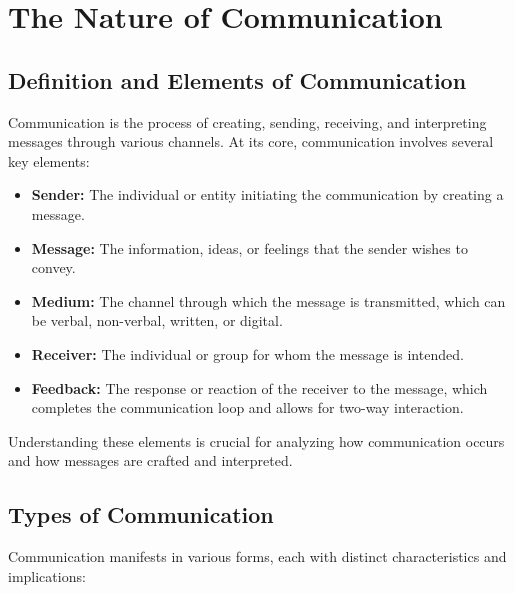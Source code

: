 \documentclass[
]{book}
\providecommand{\tightlist}{%
  \setlength{\itemsep}{0pt}\setlength{\parskip}{0pt}}
\begin{document}
\hypertarget{the-nature-of-communication}{%
\section{The Nature of Communication}\label{the-nature-of-communication}}

\hypertarget{definition-and-elements-of-communication}{%
\subsection*{Definition and Elements of Communication}\label{definition-and-elements-of-communication}}

Communication is the process of creating, sending, receiving, and interpreting messages through various channels. At its core, communication involves several key elements:

\begin{itemize}
\tightlist
\item
  \textbf{Sender:} The individual or entity initiating the communication by creating a message.
\item
  \textbf{Message:} The information, ideas, or feelings that the sender wishes to convey.
\item
  \textbf{Medium:} The channel through which the message is transmitted, which can be verbal, non-verbal, written, or digital.
\item
  \textbf{Receiver:} The individual or group for whom the message is intended.
\item
  \textbf{Feedback:} The response or reaction of the receiver to the message, which completes the communication loop and allows for two-way interaction.
\end{itemize}

Understanding these elements is crucial for analyzing how communication occurs and how messages are crafted and interpreted.

\hypertarget{types-of-communication}{%
\subsection*{Types of Communication}\label{types-of-communication}}

Communication manifests in various forms, each with distinct characteristics and implications:
\end{document}
